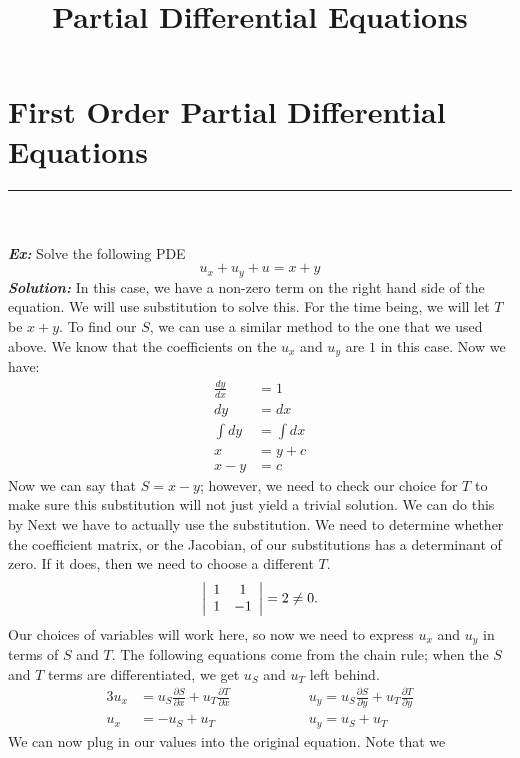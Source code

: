 \documentclass{article}
\title{Partial Differential Equations}
\date{}
\begin{document}
\maketitle
\newpage
\section{First Order Partial Differential Equations}
\hrule
\noindent\\\\
\noindent\textbf{\textit{Ex:}} Solve the following PDE
\[
u_{x} + u_{y} + u = x + y
\]
\indent \textbf{\textit{Solution:}} In this case, we have a non-zero term on the
right hand side of the equation. We will use substitution to solve this. For the
time being, we will let $T$ be $x + y$. To find our $S$, we can use a similar
method to the one that we used above. We know that the coefficients on the
$u_{x}$ and $u_{y}$ are $1$ in this case. Now we have:
\begin{align*}
\frac{dy}{dx} &= 1\\
dy &= dx\\
\int dy &= \int dx\\
x &= y + c\\
x - y &= c
\end{align*}
\noindent Now we can say that $S = x - y$; however, we need to check our choice
for $T$ to make sure this substitution will not just yield a trivial solution.
We can do this by Next we have to actually use the substitution. We need to
determine whether the coefficient matrix, or the Jacobian, of our substitutions
has a determinant of zero. If it does, then we need to choose a different $T$.
\[
\left|
\begin{array}{c c}
1 & 1\\
1 & -1
\end{array}
\right| = 2 \neq 0.
\]
Our choices of variables will work here, so now we need to express $u_{x}$ and
$u_{y}$ in terms of $S$ and $T$. The following equations come from the chain
rule; when the $S$ and $T$ terms are differentiated, we get $u_{S}$ and $u_{T}$
left behind.
\begin{alignat*}{3}
u_{x} &= u_{S}\frac{\partial S}{\partial x} + u_{T}\frac{\partial T}{\partial x}
\qquad\qquad &&u_{y} = u_{S}\frac{\partial S}{\partial y} + u_{T}\frac{\partial T}{\partial y}\\
u_{x} &= -u_{S} + u_{T}  \qquad\qquad &&u_{y} = u_{S} + u_{T}
\end{alignat*}
\noindent We can now plug in our values into the original equation. Note that we
\end{document}
